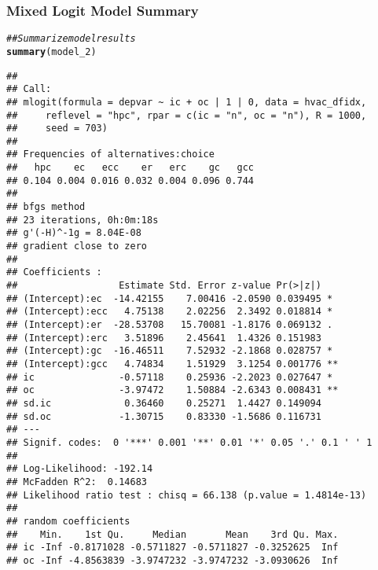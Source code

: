 \documentclass{beamer}\usepackage[]{graphicx}\usepackage[]{color}
\makeatletter
\newcommand{\hlcom}[1]{\textcolor[rgb]{0.678,0.584,0.686}{\textit{#1}}}%
\newcommand{\hlstd}[1]{\textcolor[rgb]{0.345,0.345,0.345}{#1}}%
\newcommand{\hlkwd}[1]{\textcolor[rgb]{0.737,0.353,0.396}{\textbf{#1}}}%
\newenvironment{kframe}{%
 \def\at@end@of@kframe{}%
 \ifinner\ifhmode%
  \def\at@end@of@kframe{\end{minipage}}%
  \begin{minipage}{\columnwidth}%
 \fi\fi%
 \def\FrameCommand##1{\hskip\@totalleftmargin \hskip-\fboxsep
 \colorbox{shadecolor}{##1}\hskip-\fboxsep
     \hskip-\linewidth \hskip-\@totalleftmargin \hskip\columnwidth}%
 \MakeFramed {\advance\hsize-\width
   \@totalleftmargin\z@ \linewidth\hsize
   \@setminipage}}%
 {\par\unskip\endMakeFramed%
 \at@end@of@kframe}
\newenvironment{knitrout}{}{} %
\makeatother
\begin{document}
\begin{frame}[fragile]\frametitle{Mixed Logit Model Summary}
	\vspace{1ex}
\begin{knitrout}\tiny
{}\color{fgcolor}\begin{kframe}
\begin{alltt}
\hlcom{## Summarize model results}
\hlkwd{summary}\hlstd{(model_2)}
\end{alltt}
\begin{verbatim}
## 
## Call:
## mlogit(formula = depvar ~ ic + oc | 1 | 0, data = hvac_dfidx, 
##     reflevel = "hpc", rpar = c(ic = "n", oc = "n"), R = 1000, 
##     seed = 703)
## 
## Frequencies of alternatives:choice
##   hpc    ec   ecc    er   erc    gc   gcc 
## 0.104 0.004 0.016 0.032 0.004 0.096 0.744 
## 
## bfgs method
## 23 iterations, 0h:0m:18s 
## g'(-H)^-1g = 8.04E-08 
## gradient close to zero 
## 
## Coefficients :
##                  Estimate Std. Error z-value Pr(>|z|)   
## (Intercept):ec  -14.42155    7.00416 -2.0590 0.039495 * 
## (Intercept):ecc   4.75138    2.02256  2.3492 0.018814 * 
## (Intercept):er  -28.53708   15.70081 -1.8176 0.069132 . 
## (Intercept):erc   3.51896    2.45641  1.4326 0.151983   
## (Intercept):gc  -16.46511    7.52932 -2.1868 0.028757 * 
## (Intercept):gcc   4.74834    1.51929  3.1254 0.001776 **
## ic               -0.57118    0.25936 -2.2023 0.027647 * 
## oc               -3.97472    1.50884 -2.6343 0.008431 **
## sd.ic             0.36460    0.25271  1.4427 0.149094   
## sd.oc            -1.30715    0.83330 -1.5686 0.116731   
## ---
## Signif. codes:  0 '***' 0.001 '**' 0.01 '*' 0.05 '.' 0.1 ' ' 1
## 
## Log-Likelihood: -192.14
## McFadden R^2:  0.14683 
## Likelihood ratio test : chisq = 66.138 (p.value = 1.4814e-13)
## 
## random coefficients
##    Min.    1st Qu.     Median       Mean    3rd Qu. Max.
## ic -Inf -0.8171028 -0.5711827 -0.5711827 -0.3252625  Inf
## oc -Inf -4.8563839 -3.9747232 -3.9747232 -3.0930626  Inf
\end{verbatim}
\end{kframe}
\end{knitrout}
\end{frame}
\end{document}
